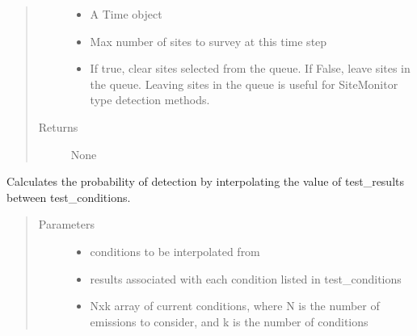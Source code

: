 \documentclass[letterpaper,10pt,english]{sphinxmanual}
\begin{document}
\begin{fulllineitems}
\begin{fulllineitems}
\begin{quote}
\begin{description}
\begin{itemize}
\item {} 
 \textendash{} A Time object

\item {} 
 \textendash{} Max number of sites to survey at this time step

\item {} 
 \textendash{} If true, clear sites selected from the queue. If False, leave sites in the queue.
Leaving sites in the queue is useful for SiteMonitor type detection methods.

\end{itemize}

\item[{Returns}] \leavevmode
None

\end{description}\end{quote}

\end{fulllineitems}


\begin{fulllineitems}
\label{\detokenize{index:feast.DetectionModules.abstract_detection_method.DetectionMethod.empirical_interpolator}}
Calculates the probability of detection by interpolating the value of test\_results between test\_conditions.
\begin{quote}\begin{description}
\item[{Parameters}] \leavevmode\begin{itemize}
\item {} 
 \textendash{} conditions to be interpolated from

\item {} 
 \textendash{} results associated with each condition listed in test\_conditions

\item {} 
 \textendash{} Nxk array of current conditions, where N is the number of emissions to consider,
and k is the number of conditions


\end{itemize}
\end{description}
\end{quote}
\end{fulllineitems}
\end{fulllineitems}
\end{document}
